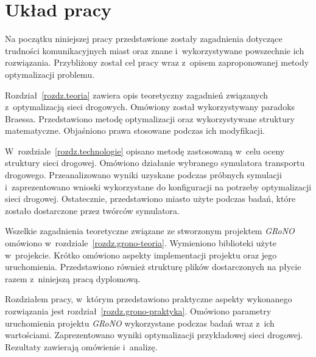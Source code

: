 \documentclass[twoside,12pt]{report}
\begin{document}


\section{Układ pracy}
Na początku niniejszej pracy przedstawione zostały zagadnienia dotyczące trudności komunikacyjnych miast oraz znane i~wykorzystywane powszechnie ich rozwiązania. Przybliżony został cel pracy wraz z~opisem zaproponowanej metody optymalizacji problemu. 

Rozdział~\ref{rozdz.teoria} zawiera opis teoretyczny zagadnień związanych z~optymalizacją sieci drogowych. Omówiony został wykorzystywany paradoks Braessa. Przedstawiono metodę optymalizacji oraz wykorzystywane struktury matematyczne. Objaśniono prawa stosowane podczas ich modyfikacji.

W~rozdziale~\ref{rozdz.technologie} opisano metodę zastosowaną w~celu oceny struktury sieci drogowej. Omówiono działanie wybranego symulatora transportu drogowego. Przeanalizowano wyniki uzyskane podczas próbnych symulacji i~zaprezentowano wnioski wykorzystane do konfiguracji na potrzeby optymalizacji sieci drogowej. Ostatecznie, przedstawiono miasto użyte podczas badań, które zostało dostarczone przez twórców symulatora.

Wszelkie zagadnienia teoretyczne związane ze stworzonym projektem \textit{GRoNO} omówiono w~rozdziale~\ref{rozdz.grono-teoria}. Wymieniono biblioteki użyte w~projekcie. Krótko omówiono aspekty implementacji projektu oraz jego uruchomienia. Przedstawiono również strukturę plików dostarczonych na płycie razem z~niniejszą pracą dyplomową.

Rozdziałem pracy, w~którym przedstawiono praktyczne aspekty wykonanego rozwiązania  jest rozdział~\ref{rozdz.grono-praktyka}. Omówiono parametry uruchomienia projektu \textit{GRoNO} wykorzystane podczas badań wraz z~ich wartościami. Zaprezentowano wyniki optymalizacji przykładowej sieci drogowej. Rezultaty zawierają  omówienie i~analizę.
\end{document}
